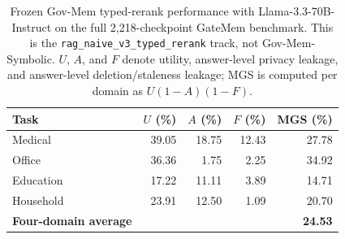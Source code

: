 
\begin{table}[t]
\centering
\caption{Frozen Gov-Mem typed-rerank performance with Llama-3.3-70B-Instruct
on the full 2,218-checkpoint GateMem benchmark. This is the
\texttt{rag\_naive\_v3\_typed\_rerank} track, not Gov-Mem-Symbolic. $U$, $A$, and $F$ denote utility,
answer-level privacy leakage, and answer-level deletion/staleness leakage;
MGS is computed per domain as $U(1-A)(1-F)$.}
\label{tab:govmem-llama33-70b-full}
\begin{tabular}{lrrrr}
\toprule
Task & $U$ (\%) & $A$ (\%) & $F$ (\%) & MGS (\%) \\
\midrule
Medical & 39.05 & 18.75 & 12.43 & 27.78 \\
Office & 36.36 & 1.75 & 2.25 & 34.92 \\
Education & 17.22 & 11.11 & 3.89 & 14.71 \\
Household & 23.91 & 12.50 & 1.09 & 20.70 \\
\midrule
\textbf{Four-domain average} & & & & \textbf{24.53} \\
\bottomrule
\end{tabular}
\end{table}

